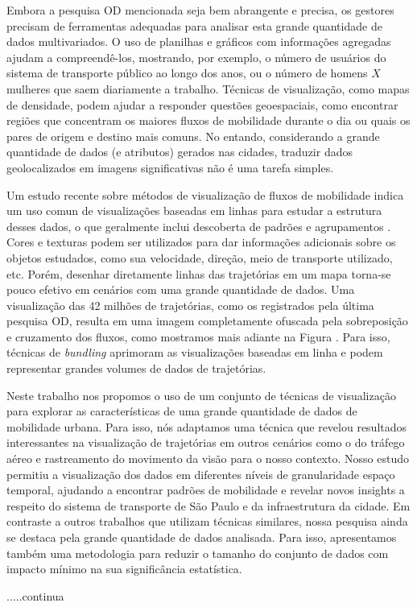 Embora a pesquisa OD mencionada seja bem abrangente e precisa, 
os gestores precisam de ferramentas adequadas para analisar esta grande quantidade de
dados multivariados. O uso de planilhas e gráficos com informações agregadas
ajudam a compreendê-los, mostrando, por exemplo, o número de usuários 
do sistema de transporte público ao longo dos anos, ou o número de homens ${X}$ mulheres
que saem diariamente a trabalho. Técnicas de visualização, como mapas de densidade,
podem ajudar a responder questões geoespaciais, como encontrar regiões que concentram
os maiores fluxos de mobilidade durante o dia ou quais os pares de origem e destino
mais comuns. No entando, considerando a grande quantidade de dados (e atributos) gerados
nas cidades, traduzir dados geolocalizados em imagens significativas não é uma tarefa simples.

Um estudo recente sobre métodos de visualização de fluxos de mobilidade indica um
uso comun de visualizações baseadas em linhas para estudar a estrutura desses dados,
o que geralmente inclui descoberta de padrões e agrupamentos \cite{Chen2015}. Cores e texturas
podem ser utilizados para dar informações adicionais sobre os objetos estudados, como sua velocidade, direção,
meio de transporte utilizado, etc. Porém, desenhar diretamente linhas das trajetórias em um mapa
torna-se pouco efetivo em cenários com uma grande quantidade de dados. Uma visualização das 42 milhões de trajetórias,
como os registrados pela última pesquisa OD, resulta em uma imagem completamente ofuscada
pela sobreposição e cruzamento dos fluxos, como mostramos mais adiante na Figura \cite{fig:cluttered-graph}.
Para isso, técnicas de \emph{bundling} aprimoram as visualizações baseadas em linha e podem
representar grandes volumes de dados de trajetórias.

Neste trabalho nos propomos o uso de um conjunto de técnicas de visualização
para explorar as características de uma grande quantidade de dados de
mobilidade urbana. Para isso, nós adaptamos uma técnica que revelou resultados
interessantes na visualização de trajetórias em outros cenários como o do
tráfego aéreo e rastreamento do movimento da visão para o nosso contexto.
Nosso estudo permitiu a visualização dos dados em diferentes níveis de
granularidade espaço temporal, ajudando a encontrar padrões de mobilidade e
revelar novos insights a respeito do sistema de transporte de S\~ao Paulo e da
infraestrutura da cidade. Em contraste a outros trabalhos que utilizam técnicas
similares, nossa pesquisa ainda se destaca pela grande quantidade de dados
analisada. Para isso, apresentamos também uma metodologia para reduzir o tamanho
do conjunto de dados com impacto mínimo na sua significância estatística.

.....continua